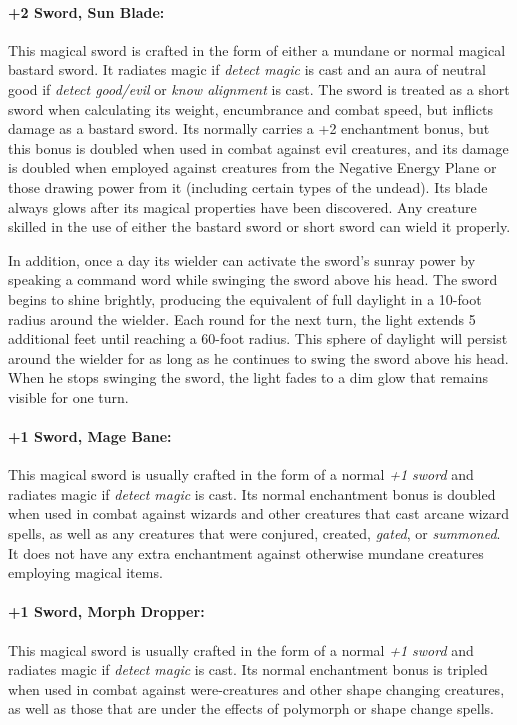 \begin{multicols}{2}
\paragraph{+2 Sword, Sun Blade:} This magical sword is crafted in the form of either a mundane or normal magical bastard sword.  It radiates magic if \textit{detect magic} is cast and an aura of neutral good if \textit{detect good/evil} or \textit{know alignment} is cast.  The sword is treated as a short sword when calculating its weight, encumbrance and combat speed, but inflicts damage as a bastard sword.  Its normally carries a +2 enchantment bonus, but this bonus is doubled when used in combat against evil creatures, and its damage is doubled when employed against creatures from the Negative Energy Plane or those drawing power from it (including certain types of the undead).  Its blade always glows after its magical properties have been discovered.  Any creature skilled in the use of either the bastard sword or short sword can wield it properly.  

In addition, once a day its wielder can activate the sword's sunray power by speaking a command word while swinging the sword above his head.  The sword begins to shine brightly, producing the equivalent of full daylight in a 10-foot radius around the wielder.  Each round for the next turn, the light extends 5 additional feet until reaching a 60-foot radius.  This sphere of daylight will persist around the wielder for as long as he continues to swing the sword above his head.  When he stops swinging the sword, the light fades to a dim glow that remains visible for one turn.

\paragraph{+1 Sword, Mage Bane:} This magical sword is usually crafted in the form of a normal \textit{+1 sword} and radiates magic if \textit{detect magic} is cast.  Its normal enchantment bonus is doubled when used in combat against wizards and other creatures that cast arcane wizard spells, as well as any creatures that were conjured, created, \textit{gated}, or \textit{summoned}.  It does not have any extra enchantment against otherwise mundane creatures employing magical items.

\paragraph{+1 Sword, Morph Dropper:} This magical sword is usually crafted in the form of a normal \textit{+1 sword} and radiates magic if \textit{detect magic} is cast.  Its normal enchantment bonus is tripled when used in combat against were-creatures and other shape changing creatures, as well as those that are under the effects of polymorph or shape change spells.


\end{multicols}
